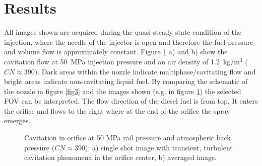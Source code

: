 \documentclass[letterpaper,twocolumn,10pt]{ilass}
\begin{document}
\section*{Results}

All images shown are acquired during the quasi-steady state condition of the injection, where
the needle of the injector is open and therefore the fuel pressure and volume flow is
approximately constant. Figure \ref{fig4} a) and b) show the cavitation flow at 50~MPa injection
pressure and an air density of 1.2~kg/m$^3$ ($CN \approx 390$). Dark areas within the nozzle
indicate multiphase/cavitating flow and bright areas indicate non-cavitating liquid fuel.
%
By comparing the schematic of the nozzle in figure \ref{fig3} and the images shown
(e.g. in figure \ref{fig4}) the selected FOV can be interpreted. The flow direction of the
diesel fuel is from top. It enters the orifice and flows to the right where at the end of the
orifice the spray emerges.


\begin{figure}[h]
\begin{center}
\end{center}
\vspace*{-10mm}
\caption{Cavitation in orifice at 50 MPa rail pressure and atmospheric back pressure
         ($CN \approx 390$): a) single shot image with transient, turbulent cavitation
				 phenomena in the orifice center, b) averaged image.}
\label{fig4} 
\end{figure}
\end{document}
